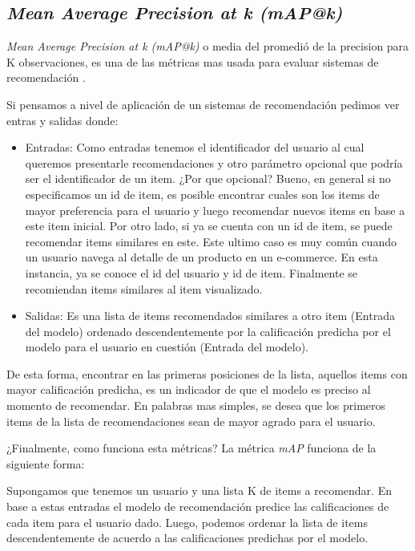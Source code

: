 \documentclass[11pt,a4paper,twoside]{thesis}
\begin{document}
{\subsection{\textit{Mean Average Precision at k (mAP@k)}}

\textit{Mean Average Precision at k (mAP@k)} o media del promedió de la precision para K observaciones, es una de las métricas mas usada para evaluar sistemas de recomendación \cite{map_at_k_1, map_at_k_2, map_at_k_3}.

Si pensamos a nivel de aplicación de un sistemas de recomendación pedimos ver
entras y salidas donde:

\begin{itemize}
	\item Entradas: Como entradas tenemos el identificador del usuario al cual queremos
	      presentarle recomendaciones y otro parámetro opcional que podría ser el
	      identificador de un item. ¿Por que opcional? Bueno, en general si no
	      especificamos un id de item, es posible encontrar cuales son los items de mayor
	      preferencia para el usuario y luego recomendar nuevos items en base a este item
	      inicial. Por otro lado, si ya se cuenta con un id de item, se puede recomendar
	      items similares en este. Este ultimo caso es muy común cuando un usuario navega
	      al detalle de un producto en un e-commerce. En esta instancia, ya se conoce el
	      id del usuario y id de item. Finalmente se recomiendan items similares al item
	      visualizado.
	\item Salidas: Es una lista de items recomendados similares a otro item (Entrada del
	      modelo) ordenado descendentemente por la calificación predicha por el modelo
	      para el usuario en cuestión (Entrada del modelo).
\end{itemize}

De esta forma, encontrar en las primeras posiciones de la lista, aquellos items
con mayor calificación predicha, es un indicador de que el modelo es preciso al
momento de recomendar. En palabras mas simples, se desea que los primeros items
de la lista de recomendaciones sean de mayor agrado para el usuario.\newline

¿Finalmente, como funciona esta métricas? La métrica \textit{mAP\makeatletter@k} funciona de la siguiente forma: \newline

Supongamos que tenemos un usuario y una lista K de items a recomendar. En base
a estas entradas el modelo de recomendación predice las calificaciones de cada
item para el usuario dado. Luego, podemos ordenar la lista de items
descendentemente de acuerdo a las calificaciones predichas por el modelo.

}
\end{document}
